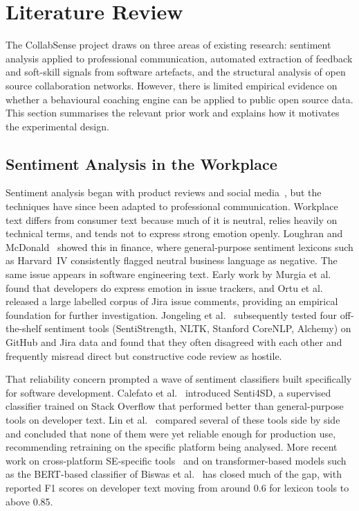 \documentclass[a4paper,UKenglish,cleveref,autoref]{lipics-v2021}
\begin{document}
\section{Literature Review}
The CollabSense project draws on three areas of existing research: sentiment analysis applied to professional communication, automated extraction of feedback and soft-skill signals from software artefacts, and the structural analysis of open source collaboration networks. However, there is limited empirical evidence on whether a behavioural coaching engine can be applied to public open source data. This section summarises the relevant prior work and explains how it motivates the experimental design.

\subsection{Sentiment Analysis in the Workplace}
Sentiment analysis began with product reviews and social media~\cite{pang2008opinion}, but the techniques have since been adapted to professional communication. Workplace text differs from consumer text because much of it is neutral, relies heavily on technical terms, and tends not to express strong emotion openly. Loughran and McDonald~\cite{loughran2011liability} showed this in finance, where general-purpose sentiment lexicons such as Harvard~IV consistently flagged neutral business language as negative. The same issue appears in software engineering text. Early work by Murgia et al.~\cite{murgia2014developers} found that developers do express emotion in issue trackers, and Ortu et al.~\cite{ortu2015bullies} released a large labelled corpus of Jira issue comments, providing an empirical foundation for further investigation. Jongeling et al.~\cite{jongeling2017negative} subsequently tested four off-the-shelf sentiment tools (SentiStrength, NLTK, Stanford CoreNLP, Alchemy) on GitHub and Jira data and found that they often disagreed with each other and frequently misread direct but constructive code review as hostile.

That reliability concern prompted a wave of sentiment classifiers built specifically for software development. Calefato et al.~\cite{calefato2018sentiment} introduced Senti4SD, a supervised classifier trained on Stack Overflow that performed better than general-purpose tools on developer text. Lin et al.~\cite{lin2018sentiment} compared several of these tools side by side and concluded that none of them were yet reliable enough for production use, recommending retraining on the specific platform being analysed. More recent work on cross-platform SE-specific tools~\cite{novielli2020sespecific} and on transformer-based models such as the BERT-based classifier of Biswas et al.~\cite{biswas2020achieving} has closed much of the gap, with reported F1 scores on developer text moving from around 0.6 for lexicon tools to above 0.85.
\end{document}
